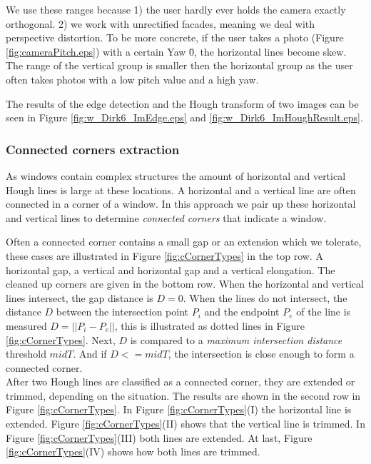 We use these ranges because 1) the user hardly ever holds the camera exactly
orthogonal.  2) we work with unrectified facades, meaning we deal with
perspective distortion.  To be more concrete, if the user takes a photo (Figure
\ref{fig:cameraPitch.eps}) with a certain Yaw \= 0, the horizontal lines become
skew.  The range of the vertical group is smaller then the horizontal group as
the user often takes photos with a low pitch value and a high yaw.

The results of the edge detection and the Hough transform of two images can be seen in Figure \ref{fig:w_Dirk6_ImEdge.eps} and
 \ref{fig:w_Dirk6_ImHoughResult.eps}.


\subsubsection{Connected corners extraction}
 As windows contain complex structures
the amount of horizontal and vertical Hough lines is large at these locations.
A horizontal and a vertical line are often connected in a corner of a window.  In
this approach we pair up these horizontal and vertical lines to determine
\emph{connected corners} that indicate a window.

Often a connected corner contains a small gap or an extension which we tolerate,
these cases are illustrated in Figure \ref{fig:cCornerTypes} in the top row.
A horizontal gap, a vertical and horizontal gap and a vertical elongation. The
cleaned up corners are given in the bottom row.  When the horizontal and
vertical lines intersect, the gap distance is $D=0$.  When the lines do not
intersect, the distance $D$ between the intersection point $P_i$ and the endpoint $P_e$ of the
line is measured $D = ||P_i-P_e||$, this is illustrated as dotted lines in Figure
\ref{fig:cCornerTypes}.  Next, $D$ is compared to a \emph{maximum intersection
distance} threshold $midT$.  And if $D<=midT$, the intersection is close enough
to form a connected corner.\\

After two Hough lines are classified as a connected corner, they are extended or
trimmed, depending on the situation. The results are shown in the second row in
Figure \ref{fig:cCornerTypes}.
In Figure \ref{fig:cCornerTypes}(I)  the horizontal line is extended.  Figure
\ref{fig:cCornerTypes}(II) shows that the vertical line is trimmed.  In Figure
\ref{fig:cCornerTypes}(III) both lines are extended.  At last, Figure
\ref{fig:cCornerTypes}(IV) shows how both lines are trimmed.


